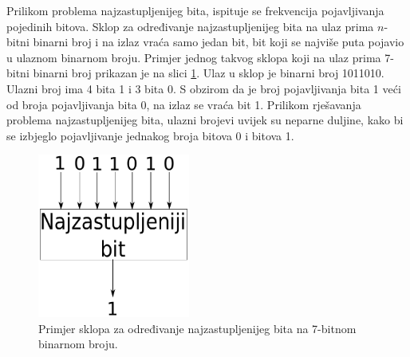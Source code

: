 \documentclass[times, utf8, zavrsni]{fer}
\begin{document}
Prilikom problema najzastupljenijeg bita, ispituje se frekvencija pojavljivanja pojedinih bitova.
Sklop za određivanje najzastupljenijeg bita na ulaz prima $n$-bitni binarni broj i na izlaz vraća samo jedan bit, bit koji se najviše puta pojavio u ulaznom binarnom broju.
Primjer jednog takvog sklopa koji na ulaz prima 7-bitni binarni broj prikazan je na slici \ref{img:majex}.
Ulaz u sklop je binarni broj 1011010.
Ulazni broj ima 4 bita 1 i 3 bita 0.
S obzirom da je broj pojavljivanja bita 1 veći od broja pojavljivanja bita 0, na izlaz se vraća bit 1.
Prilikom rješavanja problema najzastupljenijeg bita, ulazni brojevi uvijek su neparne duljine, kako bi se izbjeglo pojavljivanje jednakog broja bitova 0 i bitova 1.
\begin{figure}[h]
    \centering
    \includegraphics[width=5cm]{img/majority.pdf}
    \caption{Primjer sklopa za određivanje najzastupljenijeg bita na 7-bitnom binarnom broju.}
    \label{img:majex}
\end{figure}
\end{document}
